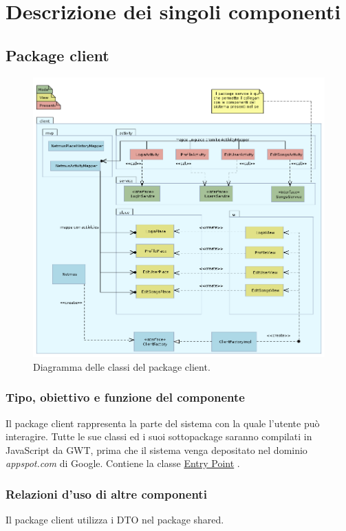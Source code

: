 \chapter{Descrizione dei singoli componenti}
\section{Package client}
\begin{figure}[h]
  \centering
  \includegraphics[width=16.5cm]{img/ST/client.png}
\caption{Diagramma delle classi del package client.}
\end{figure}

\newpage
\subsection*{Tipo, obiettivo e funzione del componente} %
Il package client rappresenta la parte del sistema con la quale l'utente pu\`o
interagire. Tutte le sue classi ed i suoi sottopackage saranno compilati in
JavaScript da GWT, prima che il sistema venga depositato nel dominio
\emph{appspot.com} di Google. Contiene la classe \underline{Entry Point}
.

\subsection*{Relazioni d'uso di altre componenti}
Il package client utilizza i DTO nel package shared.


